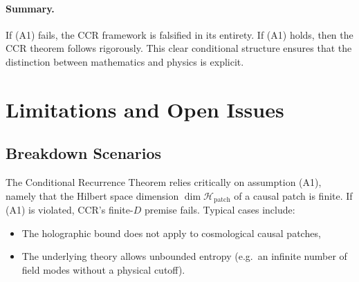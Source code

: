 \documentclass[12pt]{article}
\theoremstyle{remark}
\begin{document}
\paragraph{Summary.}
If (A1) fails, the CCR framework is falsified in its entirety. If (A1) holds,
then the CCR theorem follows rigorously. This clear conditional structure ensures
that the distinction between mathematics and physics is explicit.



\section{Limitations and Open Issues}

\subsection{Breakdown Scenarios}
The Conditional Recurrence Theorem relies critically on assumption (A1),
namely that the Hilbert space dimension $\dim\mathcal{H}_{\mathrm{patch}}$ of a causal patch is finite.
If (A1) is violated, CCR's finite-$D$ premise fails. Typical cases include:
\begin{itemize}
  \item The holographic bound does not apply to cosmological causal patches,
  \item The underlying theory allows unbounded entropy (e.g.\ an infinite number of field modes without a physical cutoff).
\end{itemize}
\end{document}
